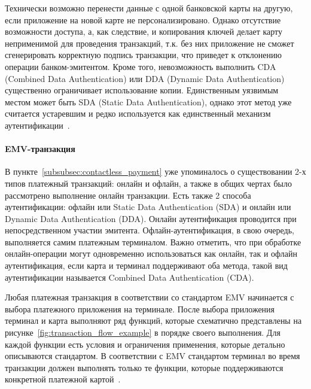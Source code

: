 Технически возможно перенести данные с одной банковской карты на другую, если приложение на новой карте не персонализировано.
Однако отсутствие возможности доступа, а, как следствие, и копирования ключей делает карту неприменимой для проведения транзакций, т.к. без них приложение не сможет сгенерировать корректную подпись транзакции, что приведет к отклонению операции банком-эмитентом.
Кроме того, невозможность выполнить CDA (Combined Data Authentication) или DDA (Dynamic Data Authentication) существенно ограничивает использование копии.
Единственным уязвимым местом может быть SDA (Static Data Authentication), однако этот метод уже считается устаревшим и редко используется как единственный механизм аутентификации~\cite{emv_card_mechanism}.

\paragraph{EMV-транзакция}
\label{par:emv_transaction}

В пункте~\ref{subsubsec:contactless_payment} уже упоминалось о существовании 2-х типов платежный транзакций: онлайн и офлайн, а также в общих чертах было рассмотрено выполнение онлайн транзакции.
Есть также 2 способа аутентификации: офлайн или Static Data Authentication (SDA) и онлайн или Dynamic Data Authentication (DDA).
Онлайн аутентификация проводится при непосредственном участии эмитента.
Офлайн-аутентификация, в свою очередь, выполняется самим платежным терминалом.
Важно отметить, что при обработке онлайн-операции могут одновременно использоваться как онлайн, так и офлайн аутентификация, если карта и терминал поддерживают оба метода, такой вид аутентификации называется Combined Data Authentication (CDA).

Любая платежная транзакция в соответствии со стандартом EMV начинается с выбора платежного приложения на терминале.
После выбора приложения терминал и карта выполняют ряд функций, которые схематично представлены на рисунке~\ref{fig:transaction_flow_example} в порядке своего выполнения.
Для каждой функции есть условия и ограничения применения, которые детально описываются стандартом.
В соответствии с EMV стандартом терминал во время транзакции должен выполнять только те функции, которые поддерживаются конкретной платежной картой~\cite{emv_book_3}.


